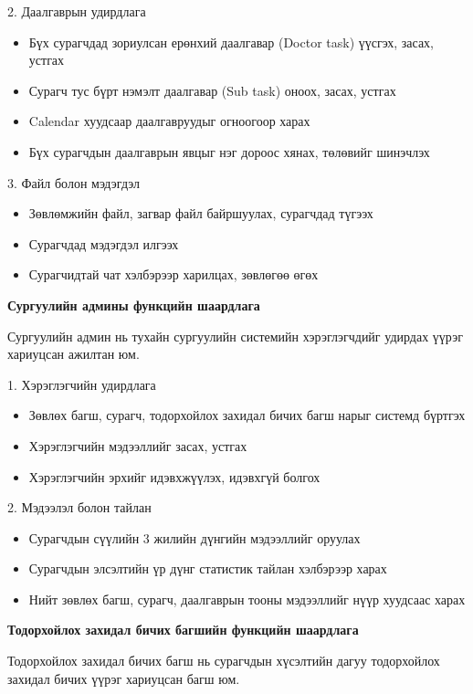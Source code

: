 2. Даалгаврын удирдлага
\begin{itemize}
    \item Бүх сурагчдад зориулсан ерөнхий даалгавар (Doctor task)
    үүсгэх, засах, устгах
    \item Сурагч тус бүрт нэмэлт даалгавар (Sub task) оноох,
    засах, устгах
    \item Calendar хуудсаар даалгавруудыг огноогоор харах
    \item Бүх сурагчдын даалгаврын явцыг нэг дороос хянах,
    төлөвийг шинэчлэх
\end{itemize}

3. Файл болон мэдэгдэл
\begin{itemize}
    \item Зөвлөмжийн файл, загвар файл байршуулах, сурагчдад
    түгээх
    \item Сурагчдад мэдэгдэл илгээх
    \item Сурагчидтай чат хэлбэрээр харилцах, зөвлөгөө өгөх
\end{itemize}

\textbf{Сургуулийн админы функцийн шаардлага}

Сургуулийн админ нь тухайн сургуулийн системийн хэрэглэгчдийг
удирдах үүрэг хариуцсан ажилтан юм.

1. Хэрэглэгчийн удирдлага
\begin{itemize}
    \item Зөвлөх багш, сурагч, тодорхойлох захидал бичих багш
    нарыг системд бүртгэх
    \item Хэрэглэгчийн мэдээллийг засах, устгах
    \item Хэрэглэгчийн эрхийг идэвхжүүлэх, идэвхгүй болгох
\end{itemize}

2. Мэдээлэл болон тайлан
\begin{itemize}
    \item Сурагчдын сүүлийн 3 жилийн дүнгийн мэдээллийг оруулах
    \item Сурагчдын элсэлтийн үр дүнг статистик тайлан хэлбэрээр
    харах
    \item Нийт зөвлөх багш, сурагч, даалгаврын тооны мэдээллийг
    нүүр хуудсаас харах
\end{itemize}

\textbf{Тодорхойлох захидал бичих багшийн функцийн шаардлага}

Тодорхойлох захидал бичих багш нь сурагчдын хүсэлтийн дагуу
тодорхойлох захидал бичих үүрэг хариуцсан багш юм.

